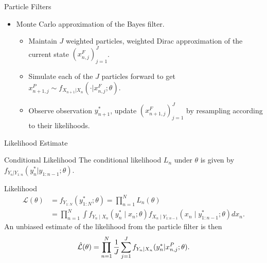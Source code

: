 \documentclass{beamer}
\begin{document}
\begin{frame}{Particle Filters}
    \begin{itemize}
        \item Monte Carlo approximation of the Bayes filter.
        \begin{itemize}
            \item \pause Maintain $J$ weighted particles, weighted Dirac approximation of the current state $(x_{n,j}^F)_{j=1}^J$. 
            \item \pause Simulate each of the $J$ particles forward to get $x_{n+1,j}^P \sim f_{X_{n+1}|X_n}(\cdot | x_{n,j}^F; \theta)$.
            \item \pause Observe observation $y_{n+1}^*$, update $(x_{n+1,j}^F)_{j=1}^J$ by resampling according to their likelihoods.
        \end{itemize}
    \end{itemize}
\end{frame}

\begin{frame}{Likelihood Estimate}
    \begin{block}{Conditional Likelihood}
        The conditional likelihood $L_n$ under $\theta$ is given by $f_{Y_n|Y_{1:n}}(y_{n}^*|y_{1:n-1};\theta)$.
    \end{block}
    \pause
    \begin{block}{Likelihood}
        \begin{align*}
            \mathcal{L}(\theta)&=f_{Y_{1: N}}\left(y_{1: N}^* ; \theta\right)
            = \prod_{n=1}^N L_n(\theta)\\
            &=\prod_{n=1}^N \int f_{Y_n \mid X_n}\left(y_n^* \mid x_n ; \theta\right) f_{X_n \mid Y_{1: n-1}}\left(x_n \mid y_{1: n-1}^* ; \theta\right) d x_n.
        \end{align*}
    \pause
    An unbiased estimate of the likelihood from the particle filter is then
        $$\hat{\mathcal{L}}(\theta) = \prod_{n=1}^N \frac{1}{J}\sum_{j=1}^J f_{Y_n|X_n}(y_n^*|x_{n,j}^P;\theta).$$
    \end{block}
\end{frame}
\end{document}
